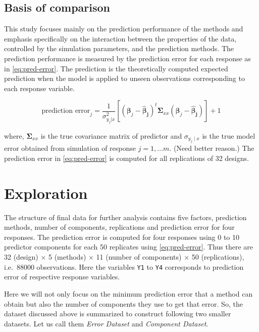 \documentclass[12pt,3p,authoryear]{elsarticle}
\begin{document}
\subsection{Basis of comparison}\label{basis-of-comparison}

This study focuses mainly on the prediction performance of the methods
and emphasis specifically on the interaction between the properties of
the data, controlled by the simulation parameters, and the prediction
methods. The prediction performance is measured by the prediction error
for each response as in \eqref{eq:pred-error}. The prediction is the
theoretically computed expected prediction when the model is applied to
unseen observations corresponding to each response variable.

\begin{equation}
\text{prediction error}_j = \frac{1}{\sigma_{y_j|x}^2}\left[\left(\boldsymbol{\beta}_j - \boldsymbol{\hat{\beta}_j}\right)^t\boldsymbol{\Sigma}_{xx}\left(\boldsymbol{\beta}_j - \boldsymbol{\hat{\beta}_j}\right)\right] + 1
\label{eq:pred-error}
\end{equation}

where, \(\boldsymbol{\Sigma}_{xx}\) is the true covariance matrix of
predictor and \(\sigma_{y_j\mid x}\) is the true model error obtained
from simulation of response \(j = 1, \ldots m\).
(\alert{Need better reason.}) The prediction error in
\eqref{eq:pred-error} is computed for all replications of 32 designs.

\section{Exploration}\label{exploration}

The structure of final data for further analysis contains five factors,
prediction methods, number of components, replications and prediction
error for four responses. The prediction error is computed for four
responses using 0 to 10 predictor components for each 50 replicates
using \eqref{eq:pred-error}. Thus there are 32 (design) \(\times\) 5
(methods) \(\times\) 11 (number of components) \(\times\) 50
(replications), i.e.~88000 observations. Here the variables \texttt{Y1}
to \texttt{Y4} corresponds to prediction error of respective response
variables.

Here we will not only focus on the minimum prediction error that a
method can obtain but also the number of components they use to get that
error. So, the dataset discussed above is summarized to construct
following two smaller datasets. Let us call them \emph{Error Dataset}
and \emph{Component Dataset}.
\end{document}
